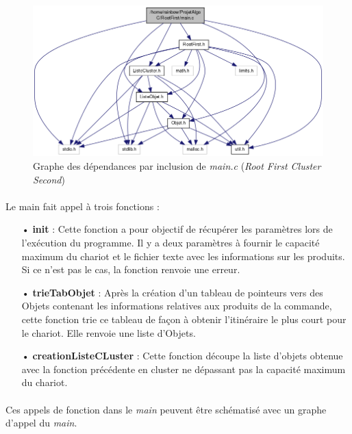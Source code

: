 \documentclass[twoside,UTF8]{EPURapport}
\begin{document}
\begin{figure}[H]
\center
\includegraphics[scale=0.5]{images/main_inclusionRF.png}
\caption{Graphe des dépendances par inclusion de \textit{main.c} (\textit{Root First Cluster Second})}
\end{figure} 

\paragraph{}
Le main fait appel à trois fonctions : 
\begin{itemize}
	\item[•]\textbf{init} : Cette fonction a pour objectif de récupérer les paramètres lors de l'exécution du programme. Il y a deux paramètres à fournir le capacité maximum du chariot et le fichier texte avec les informations sur les produits. Si ce n'est pas le cas, la fonction renvoie une erreur.
	\item[•]\textbf{trieTabObjet} : Après la création d'un tableau de pointeurs vers des Objets contenant les informations relatives aux produits de la commande, cette fonction trie ce tableau de façon à obtenir l'itinéraire le plus court pour le chariot. Elle renvoie une liste d'Objets. 
	\item[•]\textbf{creationListeCLuster} : Cette fonction découpe la liste d'objets obtenue avec la fonction précédente en cluster ne dépassant pas la capacité maximum du chariot.
\end{itemize}
\paragraph{}
Ces appels de fonction dans le \textit{main} peuvent être schématisé avec un graphe d'appel du \textit{main}.
\end{document}
